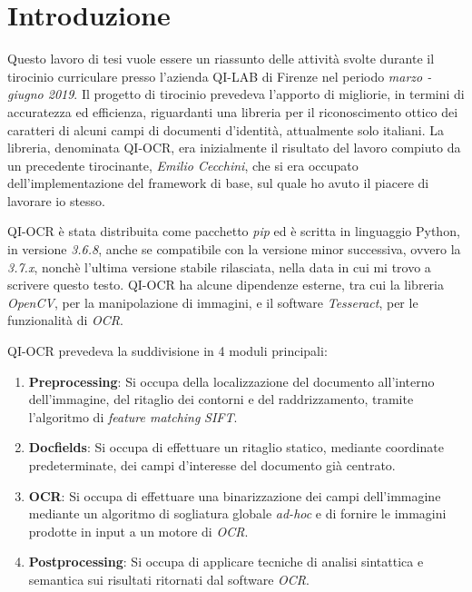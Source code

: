 \chapter*{Introduzione}

Questo lavoro di tesi vuole essere un riassunto delle attivit\`a svolte durante il tirocinio curriculare presso l'azienda QI-LAB di Firenze nel periodo \textit{marzo - giugno 2019}. Il progetto di tirocinio prevedeva l'apporto di migliorie, in termini di accuratezza ed efficienza, riguardanti una libreria per il riconoscimento ottico dei caratteri di alcuni campi di documenti d'identit\`a, attualmente solo italiani. La libreria, denominata QI-OCR, era inizialmente il risultato del lavoro compiuto da un precedente tirocinante, \textit{Emilio Cecchini}, che si era occupato dell'implementazione del framework di base, sul quale ho avuto il piacere di lavorare io stesso.\par
QI-OCR \`e stata distribuita come pacchetto \textit{pip} ed \`e scritta in linguaggio Python, in versione \textit{3.6.8}, anche se compatibile con la versione minor successiva, ovvero la \textit{3.7.x}, nonch\`e l'ultima versione stabile rilasciata, nella data in cui mi trovo a scrivere questo testo. QI-OCR ha alcune dipendenze esterne, tra cui la libreria \textit{OpenCV}, per la manipolazione di immagini, e il software \textit{Tesseract}, per le funzionalit\`a di \textit{OCR}.\par
QI-OCR prevedeva la suddivisione in 4 moduli principali:
\begin{enumerate}
	\item \textbf{Preprocessing}: Si occupa della localizzazione del documento all'interno dell'immagine, del ritaglio dei contorni e del raddrizzamento, tramite l'algoritmo di \textit{feature matching} \textit{SIFT}.
	\item \textbf{Docfields}: Si occupa di effettuare un ritaglio statico, mediante coordinate predeterminate, dei campi d'interesse del documento gi\`a centrato.
	\item \textbf{OCR}: Si occupa di effettuare una binarizzazione dei campi dell'immagine mediante un algoritmo di sogliatura globale \textit{ad-hoc} e di fornire le immagini prodotte in input a un motore di \textit{OCR}.
	\item \textbf{Postprocessing}: Si occupa di applicare tecniche di analisi sintattica e semantica sui risultati ritornati dal software \textit{OCR}.
\end{enumerate}\par
